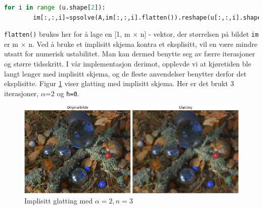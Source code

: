\begin{lstlisting}[language=Python]
    for i in range (u.shape[2]):
        im[:,:,i]=spsolve(A,im[:,:,i].flatten()).reshape(u[:,:,i].shape)
\end{lstlisting}
\texttt{flatten()} brukes her for å lage en [1, m $\times$ n] - vektor, der størrelsen på bildet \texttt{im} er m $\times$ n. Ved å bruke et implisitt skjema kontra et eksplisitt, vil en være mindre utsatt for numerisk ustabilitet. Man kan dermed benytte seg av færre iterasjoner og større tidsskritt. I vår implementasjon derimot, opplevde vi at kjøretiden ble langt lenger med implisitt skjema, og de fleste anvendelser benytter derfor det eksplisitte. Figur \ref{fig:glattingImp} viser glatting med implisitt skjema. Her er det brukt 3 iterasjoner, $\alpha$=2 og \texttt{h=0}.

\begin{figure}[H]
\begin{center}
    \includegraphics[width=1\columnwidth]{bilder/impGlatt.png}
    \caption{Implisitt glatting med $\alpha=2, n=3$~ \label{fig:glattingImp}}
\end{center}
\end{figure}